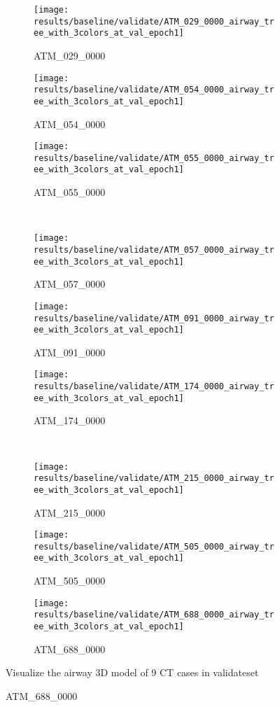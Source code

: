 \begin{figure}[!htp]
	\centering
	\begin{subfigure}{0.325\textwidth}
		\texttt{[image: results/baseline/validate/ATM\_029\_0000\_airway\_tree\_with\_3colors\_at\_val\_epoch1]}
		\caption{ATM\_029\_0000}
	\end{subfigure}
	\hfill
	\begin{subfigure}{0.325\textwidth}
		\texttt{[image: results/baseline/validate/ATM\_054\_0000\_airway\_tree\_with\_3colors\_at\_val\_epoch1]}
		\caption{ATM\_054\_0000}
	\end{subfigure}
	\hfill
	\begin{subfigure}{0.325\textwidth}
		\texttt{[image: results/baseline/validate/ATM\_055\_0000\_airway\_tree\_with\_3colors\_at\_val\_epoch1]}
		\caption{ATM\_055\_0000}
	\end{subfigure}
	\\
	\begin{subfigure}{0.325\textwidth}
		\texttt{[image: results/baseline/validate/ATM\_057\_0000\_airway\_tree\_with\_3colors\_at\_val\_epoch1]}
		\caption{ATM\_057\_0000}
	\end{subfigure}
	\hfill
	\begin{subfigure}{0.325\textwidth}
		\texttt{[image: results/baseline/validate/ATM\_091\_0000\_airway\_tree\_with\_3colors\_at\_val\_epoch1]}
		\caption{ATM\_091\_0000}
	\end{subfigure}
	\hfill
	\begin{subfigure}{0.325\textwidth}
		\texttt{[image: results/baseline/validate/ATM\_174\_0000\_airway\_tree\_with\_3colors\_at\_val\_epoch1]}
		\caption{ATM\_174\_0000}
	\end{subfigure}
	\\
	\begin{subfigure}{0.325\textwidth}
		\texttt{[image: results/baseline/validate/ATM\_215\_0000\_airway\_tree\_with\_3colors\_at\_val\_epoch1]}
		\caption{ATM\_215\_0000}
	\end{subfigure}
	\hfill
	\begin{subfigure}{0.325\textwidth}
		\texttt{[image: results/baseline/validate/ATM\_505\_0000\_airway\_tree\_with\_3colors\_at\_val\_epoch1]}
		\caption{ATM\_505\_0000}
	\end{subfigure}
	\hfill
	\begin{subfigure}{0.325\textwidth}
		\texttt{[image: results/baseline/validate/ATM\_688\_0000\_airway\_tree\_with\_3colors\_at\_val\_epoch1]}
		\caption{ATM\_688\_0000}
	\end{subfigure}
        {Visualize the airway 3D model of 9 CT cases in validateset}
	\label{fig:visualize_airway_3d_model}
\end{figure}

